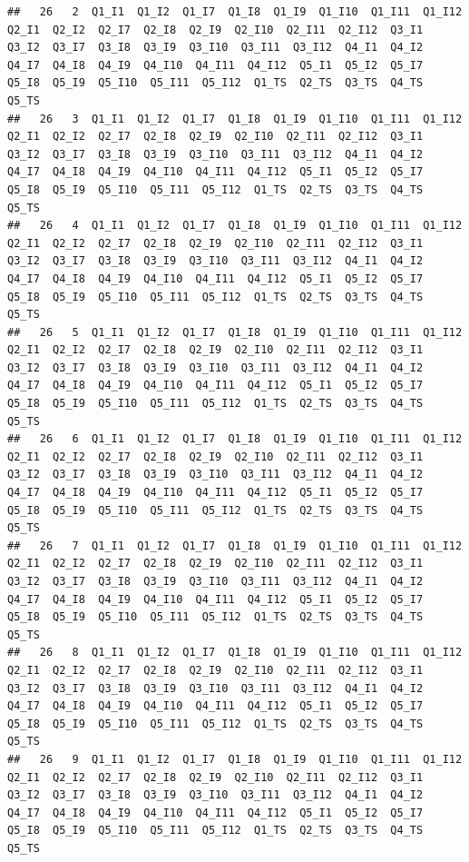 \documentclass[]{book}
\begin{document}
\begin{verbatim}
##   26   2  Q1_I1  Q1_I2  Q1_I7  Q1_I8  Q1_I9  Q1_I10  Q1_I11  Q1_I12  Q2_I1  Q2_I2  Q2_I7  Q2_I8  Q2_I9  Q2_I10  Q2_I11  Q2_I12  Q3_I1  Q3_I2  Q3_I7  Q3_I8  Q3_I9  Q3_I10  Q3_I11  Q3_I12  Q4_I1  Q4_I2  Q4_I7  Q4_I8  Q4_I9  Q4_I10  Q4_I11  Q4_I12  Q5_I1  Q5_I2  Q5_I7  Q5_I8  Q5_I9  Q5_I10  Q5_I11  Q5_I12  Q1_TS  Q2_TS  Q3_TS  Q4_TS  Q5_TS
##   26   3  Q1_I1  Q1_I2  Q1_I7  Q1_I8  Q1_I9  Q1_I10  Q1_I11  Q1_I12  Q2_I1  Q2_I2  Q2_I7  Q2_I8  Q2_I9  Q2_I10  Q2_I11  Q2_I12  Q3_I1  Q3_I2  Q3_I7  Q3_I8  Q3_I9  Q3_I10  Q3_I11  Q3_I12  Q4_I1  Q4_I2  Q4_I7  Q4_I8  Q4_I9  Q4_I10  Q4_I11  Q4_I12  Q5_I1  Q5_I2  Q5_I7  Q5_I8  Q5_I9  Q5_I10  Q5_I11  Q5_I12  Q1_TS  Q2_TS  Q3_TS  Q4_TS  Q5_TS
##   26   4  Q1_I1  Q1_I2  Q1_I7  Q1_I8  Q1_I9  Q1_I10  Q1_I11  Q1_I12  Q2_I1  Q2_I2  Q2_I7  Q2_I8  Q2_I9  Q2_I10  Q2_I11  Q2_I12  Q3_I1  Q3_I2  Q3_I7  Q3_I8  Q3_I9  Q3_I10  Q3_I11  Q3_I12  Q4_I1  Q4_I2  Q4_I7  Q4_I8  Q4_I9  Q4_I10  Q4_I11  Q4_I12  Q5_I1  Q5_I2  Q5_I7  Q5_I8  Q5_I9  Q5_I10  Q5_I11  Q5_I12  Q1_TS  Q2_TS  Q3_TS  Q4_TS  Q5_TS
##   26   5  Q1_I1  Q1_I2  Q1_I7  Q1_I8  Q1_I9  Q1_I10  Q1_I11  Q1_I12  Q2_I1  Q2_I2  Q2_I7  Q2_I8  Q2_I9  Q2_I10  Q2_I11  Q2_I12  Q3_I1  Q3_I2  Q3_I7  Q3_I8  Q3_I9  Q3_I10  Q3_I11  Q3_I12  Q4_I1  Q4_I2  Q4_I7  Q4_I8  Q4_I9  Q4_I10  Q4_I11  Q4_I12  Q5_I1  Q5_I2  Q5_I7  Q5_I8  Q5_I9  Q5_I10  Q5_I11  Q5_I12  Q1_TS  Q2_TS  Q3_TS  Q4_TS  Q5_TS
##   26   6  Q1_I1  Q1_I2  Q1_I7  Q1_I8  Q1_I9  Q1_I10  Q1_I11  Q1_I12  Q2_I1  Q2_I2  Q2_I7  Q2_I8  Q2_I9  Q2_I10  Q2_I11  Q2_I12  Q3_I1  Q3_I2  Q3_I7  Q3_I8  Q3_I9  Q3_I10  Q3_I11  Q3_I12  Q4_I1  Q4_I2  Q4_I7  Q4_I8  Q4_I9  Q4_I10  Q4_I11  Q4_I12  Q5_I1  Q5_I2  Q5_I7  Q5_I8  Q5_I9  Q5_I10  Q5_I11  Q5_I12  Q1_TS  Q2_TS  Q3_TS  Q4_TS  Q5_TS
##   26   7  Q1_I1  Q1_I2  Q1_I7  Q1_I8  Q1_I9  Q1_I10  Q1_I11  Q1_I12  Q2_I1  Q2_I2  Q2_I7  Q2_I8  Q2_I9  Q2_I10  Q2_I11  Q2_I12  Q3_I1  Q3_I2  Q3_I7  Q3_I8  Q3_I9  Q3_I10  Q3_I11  Q3_I12  Q4_I1  Q4_I2  Q4_I7  Q4_I8  Q4_I9  Q4_I10  Q4_I11  Q4_I12  Q5_I1  Q5_I2  Q5_I7  Q5_I8  Q5_I9  Q5_I10  Q5_I11  Q5_I12  Q1_TS  Q2_TS  Q3_TS  Q4_TS  Q5_TS
##   26   8  Q1_I1  Q1_I2  Q1_I7  Q1_I8  Q1_I9  Q1_I10  Q1_I11  Q1_I12  Q2_I1  Q2_I2  Q2_I7  Q2_I8  Q2_I9  Q2_I10  Q2_I11  Q2_I12  Q3_I1  Q3_I2  Q3_I7  Q3_I8  Q3_I9  Q3_I10  Q3_I11  Q3_I12  Q4_I1  Q4_I2  Q4_I7  Q4_I8  Q4_I9  Q4_I10  Q4_I11  Q4_I12  Q5_I1  Q5_I2  Q5_I7  Q5_I8  Q5_I9  Q5_I10  Q5_I11  Q5_I12  Q1_TS  Q2_TS  Q3_TS  Q4_TS  Q5_TS
##   26   9  Q1_I1  Q1_I2  Q1_I7  Q1_I8  Q1_I9  Q1_I10  Q1_I11  Q1_I12  Q2_I1  Q2_I2  Q2_I7  Q2_I8  Q2_I9  Q2_I10  Q2_I11  Q2_I12  Q3_I1  Q3_I2  Q3_I7  Q3_I8  Q3_I9  Q3_I10  Q3_I11  Q3_I12  Q4_I1  Q4_I2  Q4_I7  Q4_I8  Q4_I9  Q4_I10  Q4_I11  Q4_I12  Q5_I1  Q5_I2  Q5_I7  Q5_I8  Q5_I9  Q5_I10  Q5_I11  Q5_I12  Q1_TS  Q2_TS  Q3_TS  Q4_TS  Q5_TS

\end{verbatim}
\end{document}
